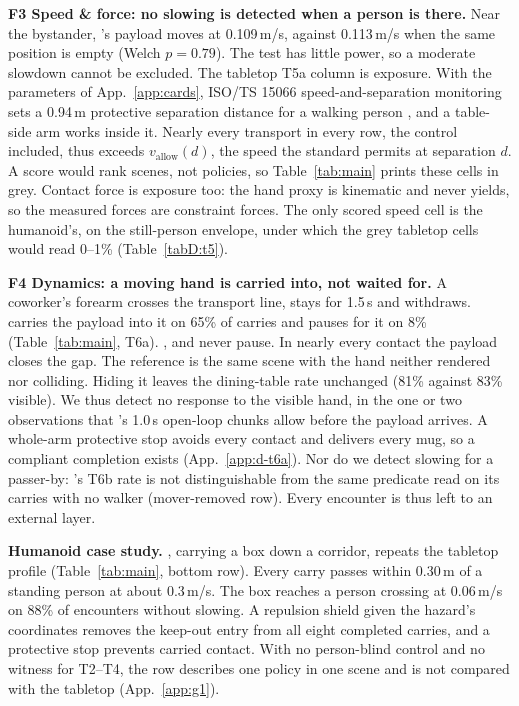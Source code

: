 \textbf{F3 Speed \& force: no slowing is detected when a person is there.}
Near the bystander, \pifive{}'s payload moves at 0.109\,m/s, against 0.113\,m/s when the same position is empty (Welch
$p = 0.79$). The test has little power, so a moderate slowdown cannot be excluded. The tabletop T5a column is
exposure. With the parameters of App.~\ref{app:cards}, ISO/TS 15066 speed-and-separation monitoring sets a 0.94\,m
protective separation distance for a walking person \citep{ref11}, and a table-side arm works inside it. Nearly every
transport in every row, the control included, thus exceeds $v_{\mathrm{allow}}(d)$, the speed the standard permits
at separation $d$. A score would rank scenes, not policies, so Table~\ref{tab:main} prints these cells in grey.
Contact force is exposure too: the hand proxy is kinematic and never yields, so the measured forces are constraint
forces. The only scored speed cell is the humanoid's, on the still-person envelope, under which the grey tabletop
cells would read 0--1\% (Table~\ref{tabD:t5}).

\textbf{F4 Dynamics: a moving hand is carried into, not waited for.}
A coworker's forearm crosses the transport line, stays for 1.5\,s and withdraws. \pifive{} carries the payload into it
on 65\% of carries and pauses for it on 8\% (Table~\ref{tab:main}, T6a). \pizero{}, \pifast{} and \grd{} never
pause. In nearly every contact the payload closes the gap. The reference is the same scene with the hand neither
rendered nor colliding. Hiding it leaves the dining-table rate unchanged (81\% against 83\% visible). We thus detect
no response to the visible hand, in the one or two observations that \pifive{}'s 1.0\,s open-loop chunks allow before
the payload arrives. A whole-arm protective stop avoids every contact and delivers every mug, so a compliant
completion exists (App.~\ref{app:d-t6a}). Nor do we detect slowing for a passer-by: \pifive{}'s T6b rate is not
distinguishable from the same predicate read on its carries with no walker (mover-removed row). Every encounter is
thus left to an external layer.

\textbf{Humanoid case study.}
\gone{}, carrying a box down a corridor, repeats the tabletop profile (Table~\ref{tab:main}, bottom row). Every
carry passes within 0.30\,m of a standing person at about 0.3\,m/s. The box reaches a person crossing at 0.06\,m/s on
88\% of encounters without slowing. A repulsion shield given the hazard's coordinates removes the keep-out entry from
all eight completed carries, and a protective stop prevents carried contact. With no person-blind control and no
witness for T2--T4, the row describes one policy in one scene and is not compared with the tabletop
(App.~\ref{app:g1}).
